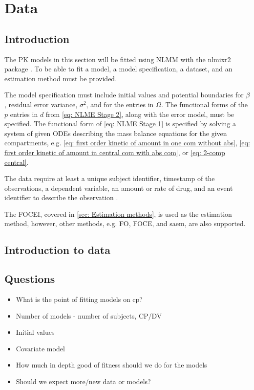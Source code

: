 \chapter{Data}
\section{Introduction}
The PK models in this section will be fitted using NLMM with the nlmixr2 package \citep{nlmixr, nlmixrarticle}. To be able to fit a model, a model specification, a dataset, and an estimation method must be provided.

The model specification must include initial values and potential boundaries for $\beta$, residual error variance, $\sigma^2$, and for the entries in $\Omega$. The functional forms of the $p$ entries in $d$ from \eqref{eq: NLME Stage 2}, along with the error model, must be specified.
The functional form of \ref{eq: NLME Stage 1} is specified by solving a system of given ODEs describing the mass balance equations for the given compartments, e.g. \eqref{eq: first order kinetic of amount in one com without abs}, \eqref{eq: first order kinetic of amount in central com with abs com}, or \eqref{eq: 2-comp central}.

The data require at least a unique subject identifier, timestamp of the observations, a dependent variable, an amount or rate of drug, and an event identifier to describe the observation \citep{nlmixrarticle}. 

The FOCEI, covered in \ref{sec: Estimation methods}, is used as the estimation method, however, other methods, e.g. FO, FOCE, and saem, are also supported. 



\section{Introduction to data}
\section{Questions}
\begin{itemize}
    \item What is the point of fitting models on cp?
    \item Number of models - number of subjects, CP/DV
    \item Initial values
    \item Covariate model
    \item How much in depth good of fitness should we do for the models
    \item Should we expect more/new data or models?
\end{itemize}


